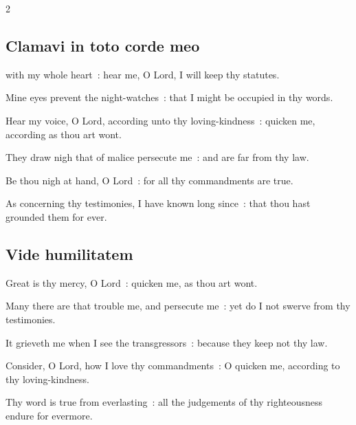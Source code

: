\begin{multicols}{2}
\subsection{Clamavi in toto corde meo}
 with my whole heart~: hear me, O Lord, I will keep thy statutes.\par
{}
Mine eyes prevent the night-watches~: that I might be occupied in thy words.\par
{}Hear my voice, O Lord, according unto thy loving-kindness~: quicken me, according as thou art wont.\par
{}They draw nigh that of malice persecute me~: and are far from thy law.\par
{}Be thou nigh at hand, O Lord~: for all thy commandments are true.\par
{}As concerning thy testimonies, I have known long since~: that thou hast grounded them for ever.\par

\subsection{Vide humilitatem}


\par
{}
Great is thy mercy, O Lord~: quicken me, as thou art wont.\par
{}Many there are that trouble me, and persecute me~: yet do I not swerve from thy testimonies.\par
{}It grieveth me when I see the transgressors~: because they keep not thy law.\par
{}Consider, O Lord, how I love thy commandments~: O quicken me, according to thy loving-kindness.\par
{}Thy word is true from everlasting~: all the judgements of thy righteousness endure for evermore.\par


\end{multicols}
